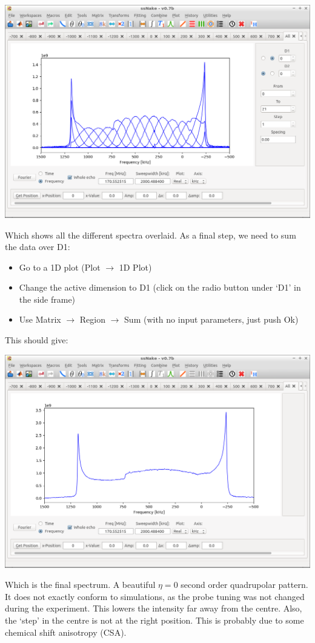 \documentclass[11pt,a4paper]{article}
\begin{document}
\begin{center}
\includegraphics[width=0.8\linewidth]{Figs/Fig3.png}
\end{center}

Which shows all the different spectra overlaid. As a final step, we need to sum the data over D1:
\begin{itemize}
\item Go to a 1D plot (Plot $\longrightarrow$ 1D Plot)
\item Change the active dimension to D1 (click on the radio button under `D1' in the side frame)
\item Use Matrix $\longrightarrow$ Region $\longrightarrow$ Sum (with no input parameters, just push
  Ok)
\end{itemize}
This should give:
\begin{center}
\includegraphics[width=0.8\linewidth]{Figs/Fig4.png}
\end{center}
Which is the final spectrum. A beautiful $\eta = 0$ second order quadrupolar pattern. It does not
exactly conform to simulations, as the probe tuning was not changed during the experiment. This
lowers the intensity far away from the centre. Also, the `step' in the centre is not at the right
position. This is probably due to some chemical shift anisotropy (CSA).
\end{document}
